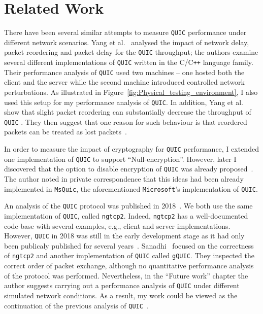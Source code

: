 \documentclass[12pt,a4paper,twoside,openright]{report}
\begin{document}
\section{Related Work}
There have been several similar attempts to measure \texttt{QUIC} performance under different network scenarios. 
Yang et al.~\cite{Making_QUIC_Quicker} analysed the impact of network delay, packet reordering and packet delay for the \texttt{QUIC} throughput; the authors examine several different implementations of \texttt{QUIC} written in the C/C\texttt{++} language family.
Their performance analysis of \texttt{QUIC} used two machines -- one hosted both the client and the server while the second machine introduced controlled network perturbations.
As illustrated in Figure~\ref{fig:Physical_testing_environment}, I also used this setup for my performance analysis of \texttt{QUIC}.
In addition, Yang et al.~\cite{Making_QUIC_Quicker} show that slight packet reordering can substantially decrease the throughput of \texttt{QUIC} .
They then suggest that one reason for such behaviour is that reordered packets can be treated as lost packets~\cite{Making_QUIC_Quicker}. 


In order to measure the impact of cryptography for \texttt{QUIC} performance, I extended one implementation of \texttt{QUIC} to support \enquote{Null-encryption}.
However, later I discovered that the option to disable encryption of \texttt{QUIC} was already proposed~\cite{banks-quic-disable-encryption-00}.
The author noted in private correspondence that this ideas had been already implemented in \texttt{MsQuic}, the aforementioned \texttt{Microsoft}'s implementation of \texttt{QUIC}.



An analysis of the \texttt{QUIC} protocol was published in 2018~\cite{overview_of_the_QUIC_protocol}.
We both use the same implementation of \texttt{QUIC}, called \texttt{ngtcp2}.
Indeed, \texttt{ngtcp2} has a well-documented code-base with several examples, e.g., client and server implementations.   
However, \texttt{QUIC} in 2018 was still in the early development stage as it had only been publicaly published for several years~\cite{Chromium_Blog_Experimenting_with_quic}.
Sanadhi~\cite{overview_of_the_QUIC_protocol} focused on the correctness of \texttt{ngtcp2} and another implementation of \texttt{QUIC} called \texttt{gQUIC}.
They inspected the correct order of packet exchange, although no quantitative performance analysis of the protocol was performed.
Nevertheless, in the \enquote{Future work} chapter the author suggests carrying out a performance analysis of \texttt{QUIC} under different simulated network conditions.
As a result, my work could be viewed as the continuation of the previous analysis of \texttt{QUIC}~\cite{overview_of_the_QUIC_protocol}.
\end{document}
